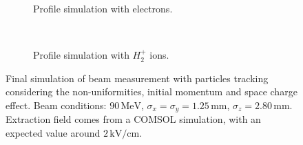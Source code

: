 \begin{figure}[!ht]
	\begin{subfigure}[t]{0.5\textwidth}
		
		\caption[Profile simulation with electrons]{Profile simulation with electrons.}
		\label{chap3:fig:SC_profile_a}
	\end{subfigure}
	~
	\begin{subfigure}[t]{0.5\textwidth}
		
		\caption[Profile simulation with $H^{+}_{2}$ ions]{Profile simulation with $H^{+}_{2}$ ions.}
		\label{chap3:fig:SC_profile_b}
	\end{subfigure}
  \caption[Final simulation of beam measurement with particles tracking considering the non-uniformities, initial momentum and space charge effect]{Final simulation of beam measurement with particles tracking considering the non-uniformities, initial momentum and space charge effect. Beam conditions: $90\,\mathrm{MeV}$, $\sigma_{x}=\sigma_{y}=1.25\,\mathrm{mm}$, $\sigma_{z} = 2.80\,\mathrm{mm}$. Extraction field comes from a COMSOL simulation, with an expected value around $2\,\mathrm{kV/cm}$.}
	\label{chap3:fig:SC_profile}
\end{figure}
